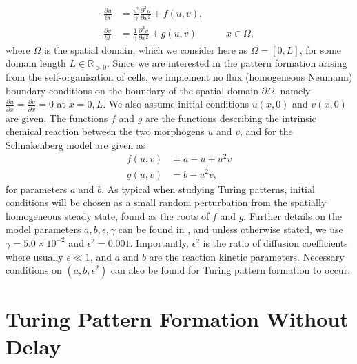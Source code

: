 \documentclass[12pt,a4paper]{report}
\begin{document}
\begin{equation}\label{system}
    \begin{split}
    \frac{\partial u}{\partial t}&=\frac{\epsilon^2}{\gamma}\frac{\partial^2 u}{\partial x^2}+f(u,v),\\
    \frac{\partial v}{\partial t}&=\frac{1}{\gamma}\frac{\partial^2 v}{\partial x^2}+g(u,v) \quad\quad\quad x\in\Omega,
    \end{split}
\end{equation}
where $\Omega$ is the spatial domain, which we consider here as $\Omega=[0,L]$, for some domain length $L\in\mathbb{R}_{>0}$. Since we are interested in the pattern formation arising from the self-organisation of cells, we implement no flux (homogeneous Neumann) boundary conditions on the boundary of the spatial domain $\partial\Omega$, namely $\frac{\partial u}{\partial x}=\frac{\partial v}{\partial x}=0$ at $x=0, L$. We also assume initial conditions $u(x,0)$ and $v(x,0)$ are given. The functions $f$ and $g$ are the functions describing the intrinsic chemical reaction between the two morphogens $u$ and $v$, and for the Schnakenberg model are given as
\begin{equation}
    \begin{split}
        f(u,v)&=a-u+u^2v\\
        g(u,v)&=b-u^2v,
    \end{split}
\end{equation}
for parameters $a$ and $b$.
As typical when studying Turing patterns, initial conditions will be chosen as a small random perturbation from the spatially homogeneous steady state, found as the roots of $f$ and $g$.
Further details on the model parameters $a,b,\epsilon,\gamma$ can be found in \cite{gaffmonk}, and unless otherwise stated, we use $\gamma=5.0\times10^{-2}$ and $\epsilon^2=0.001$. Importantly, $\epsilon^2$ is the ratio of diffusion coefficients where usually $\epsilon\ll1$, and $a$ and $b$ are the reaction kinetic parameters. Necessary conditions on $(a,b,\epsilon^2)$ can also be found for Turing pattern formation to occur.



\section{Turing Pattern Formation Without Delay}
\end{document}
